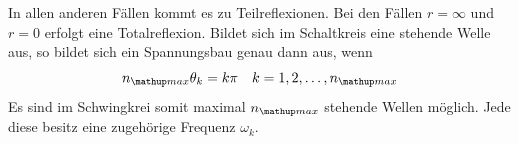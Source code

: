 In allen anderen Fällen kommt es zu Teilreflexionen.
Bei den Fällen $r=\infty$ und $r=0$ erfolgt eine Totalreflexion.
Bildet sich im Schaltkreis eine stehende Welle aus, so bildet sich ein Spannungsbau genau dann aus, wenn %
\begin{equation}
\label{eq:spannungsbauch}
n\ua{max}\theta_k=k\pi \quad k=1,2,\dots,n\ua{max}
\end{equation}
Es sind im Schwingkrei somit maximal $n\ua{max}$ stehende Wellen möglich. %
Jede diese besitz eine zugehörige Frequenz $\omega_k$. %

